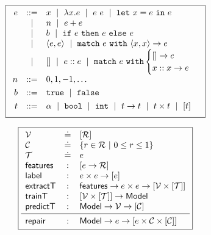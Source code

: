 \begin{figure}
\small
\centering
\begin{minipage}[c]{\linewidth}
  \[
  \boxed{
  \begin{array}{rcl}
  e & ::=    & x \ \mid\  \lambda x. e \ \mid\  e\ e \ \mid\  \mathtt{let}\ x = e\ \mathtt{in}\ e \\
    & \ \mid\  & n \ \mid\  e + e\\
    & \ \mid\  & b \ \mid\  \mathtt{if}\ e\ \mathtt{then}\ e\ \mathtt{else}\ e \\
    & \ \mid\  & \langle e, e \rangle \ \mid\  \mathtt{match}\ e\ \mathtt{with}\ \langle x, x \rangle \to e \\
    & \ \mid\  & \mathtt{[]} \ \mid\  e :: e \ \mid\  \mathtt{match}\ e\ \mathtt{with} \begin{cases} \mathtt{[]} \to e\\ x :: x \to e \end{cases} \\[0.05in]

  n & ::= &  0, 1, -1, \ldots \\[0.05in]

  b & ::= &  \mathtt{true} \ \mid\  \mathtt{false} \\[0.05in]

  t & ::= & \alpha \ \mid\  \mathtt{bool} \ \mid\  \mathtt{int} \ \mid\  t \to t \ \mid\  t \times t \ \mid\  [t] \\[0.05in]
  \end{array}
  }
  \]
  \label{fig:syntax}
\end{minipage}
\begin{minipage}[c]{\linewidth}
  \lstDeleteShortInline{|} %
  \[
  \boxed{
  \begin{array}{lcl}
    \V           & \defeq & \List{\R}\\
    \Runit       & \defeq & \{r \in \R\ |\ 0 \le r \le 1\} \\ %
    \T           & \defeq & e\\
    \featuresym  & : & \List{e \to \R} \\
    \labelsym    & : & e \times e \to \List{e} \\
    \extractTsym & : & \featuresym \to e \times e \to \List{\V \times \List{\T}} \\
    \trainTsym   & : & \List{\V \times \List{\T}} \to \Model \\
    \predictTsym & : & \Model \to \V \to \List{\Runit} \\
    \midrule
    \repairsym   & : & \Model \to e \to \List{e \times \Runit \times \List{\Runit}}
  \end{array}
  }
  \]
  \lstMakeShortInline{|}
  \label{fig:api}
\end{minipage}
\end{figure}
